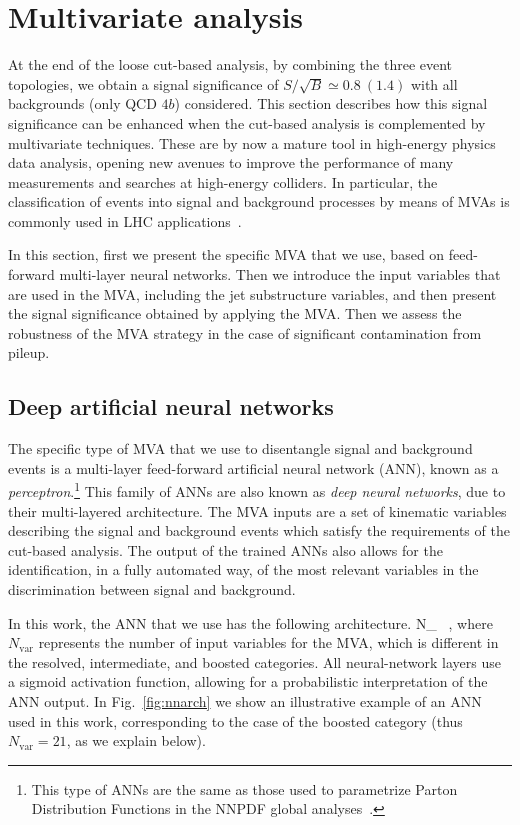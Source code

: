 \section{Multivariate analysis}
\label{sec:mva}

At the end of the loose cut-based analysis,
by combining the three event topologies,
we obtain a signal significance of $S/\sqrt{B}\simeq 0.8~(1.4)$
with all backgrounds (only QCD $4b$) considered.
%
This section describes how this signal significance
 can be enhanced when the cut-based analysis
 is complemented by multivariate techniques.
%
 These are by now a mature tool
 in high-energy physics data analysis, opening
 new avenues to improve the performance
of many measurements and searches at high-energy colliders.
%
In particular, the classification of events into
signal and
background processes by means of MVAs is
commonly used in LHC
applications~\cite{Baldi:2014pta,Aaltonen:2012qt,
  Wardrope:2014kya,Chatrchyan:2013zna,Dall'Osso:2015aia}.

In this section, first we present the specific MVA that we use,
based on feed-forward multi-layer neural networks.
%
Then we introduce the input variables that are
used in the MVA, including the jet substructure
variables, and then present the signal significance obtained
by applying the MVA.
%
Then we assess the robustness of the MVA strategy in
the case of significant contamination from pileup.

\subsection{Deep artificial neural networks}

The specific type of  MVA that we use to
disentangle signal and background events is
a multi-layer feed-forward artificial neural network (ANN),
known as a {\it perceptron}.\footnote{This type of ANNs are the same
  as those used to parametrize Parton Distribution Functions
in the NNPDF global analyses~\cite{DelDebbio:2004qj,Ball:2008by,Ball:2011mu,Ball:2010de}.}
%
This family of ANNs are also known as {\it deep neural networks},
due to their multi-layered architecture.
%
The MVA inputs are a set of kinematic variables describing the
signal and background
events which satisfy the requirements of the
cut-based analysis.
%
The output of the trained ANNs also allows for the identification,
in a fully automated way,
of the most relevant variables in the discrimination between 
signal and background.

In this work, the ANN that we use has the following architecture.
\be
\label{eq:nn1}
N_{} \, ,
\ee
where $N_{\mathrm{var}}$ represents the number of input variables for the MVA,
which is different in the resolved, intermediate, and boosted categories.
%
All neural-network layers use a sigmoid activation function, allowing
for a probabilistic
interpretation of the ANN output.
%
In Fig.~\ref{fig:nnarch} we show an illustrative
example of an ANN used in this work, corresponding 
to the case of the boosted category (thus $N_{\mathrm{var}}=21$, as we explain below).

